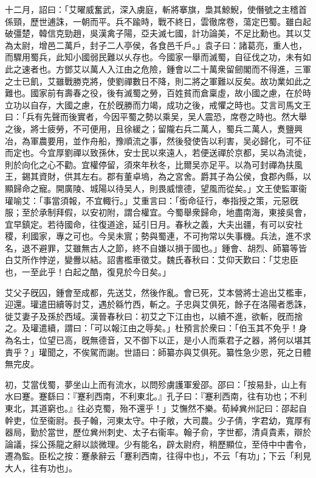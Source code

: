 \begin{pinyinscope}
十二月，詔曰：「艾曜威奮武，深入虜庭，斬將搴旗，梟其鯨鯢，使僭號之主稽首係頸，歷世逋誅，一朝而平。兵不踰時，戰不終日，雲徹席卷，蕩定巴蜀。雖白起破彊楚，韓信克勁趙，吳漢禽子陽，亞夫滅七國，計功論美，不足比勳也。其以艾為太尉，增邑二萬戶，封子二人亭侯，各食邑千戶。」袁子曰：諸葛亮，重人也，而驟用蜀兵，此知小國弱民難以乆存也。今國家一舉而滅蜀，自征伐之功，未有如此之速者也。方鄧艾以萬人入江由之危險，鍾會以二十萬衆留劒閣而不得進，三軍之士已飢，艾雖戰勝克將，使劉禪數日不降，則二將之軍難以反矣。故功業如此之難也。國家前有壽春之役，後有滅蜀之勞，百姓貧而倉稟虛，故小國之慮，在於時立功以自存，大國之慮，在於旣勝而力竭，成功之後，戒懼之時也。艾言司馬文王曰：「兵有先聲而後實者，今因平蜀之勢以乘吴，吴人震恐，席卷之時也。然大舉之後，將士疲勞，不可便用，且徐緩之；留隴右兵二萬人，蜀兵二萬人，煑鹽興冶，為軍農要用，並作舟船，豫順流之事，然後發使告以利害，吴必歸化，可不征而定也。今宜厚劉禪以致孫休，安士民以來遠人，若便送禪於京都，吴以為流徙，則於向化之心不勸。宜權停留，須來年秋冬，比爾吴亦足平。以為可封禪為扶風王，錫其資財，供其左右。郡有董卓塢，為之宮舍。爵其子為公侯，食郡內縣，以顯歸命之寵。開廣陵、城陽以待吴人，則畏威懷德，望風而從矣。」文王使監軍衞瓘喻艾：「事當須報，不宜輙行。」艾重言曰：「銜命征行，奉指授之策，元惡旣服；至於承制拜假，以安初附，謂合權宜。今蜀舉衆歸命，地盡南海，東接吳會，宜早鎮定。若待國命，往復道途，延引日月。春秋之義，大夫出疆，有可以安社稷，利國家，專之可也。今吴未賔；勢與蜀連，不可拘常以失事機。兵法，進不求名，退不避罪，艾雖無古人之節，終不自嫌以損于國也。」鍾會、胡烈、師纂等皆白艾所作悖逆，變釁以結。詔書檻車徵艾。魏氏春秋曰：艾仰天歎曰：「艾忠臣也，一至此乎！白起之酷，復見於今日矣。」

艾父子旣囚，鍾會至成都，先送艾，然後作亂。會已死，艾本營將士追出艾檻車，迎還。瓘遣田續等討艾，遇於緜竹西，斬之。子忠與艾俱死，餘子在洛陽者悉誅，徙艾妻子及孫於西域。漢晉春秋曰：初艾之下江由也，以續不進，欲斬，旣而捨之。及瓘遣續，謂曰：「可以報江由之辱矣。」杜預言於衆曰：「伯玉其不免乎！身為名士，位望已高，旣無德音，又不御下以正，是小人而乘君子之器，將何以堪其責乎？」瓘聞之，不俟駕而謝。世語曰：師纂亦與艾俱死。纂性急少恩，死之日體無完皮。

初，艾當伐蜀，夢坐山上而有流水，以問殄虜護軍爰邵。邵曰：「按易卦，山上有水曰蹇。蹇繇曰：『蹇利西南，不利東北。』孔子曰：『蹇利西南，往有功也；不利東北，其道窮也。』往必克蜀，殆不還乎！」艾憮然不樂。荀綽兾州記曰：邵起自幹吏，位至衞尉。長子翰，河東太守。中子敞，大司農。少子倩，字君幼，寬厚有器局，勤於當世，歷位兾州刺史、太子右衞率。翰子俞，字世都，清貞貴素，辯於論議，採公孫龍之辭以談微理。少有能名，辟太尉府，稍歷顯位，至侍中中書令，遷為監。臣松之按：蹇彖辭云「蹇利西南，往得中也」，不云「有功」；下云「利見大人，往有功也」。


\end{pinyinscope}
